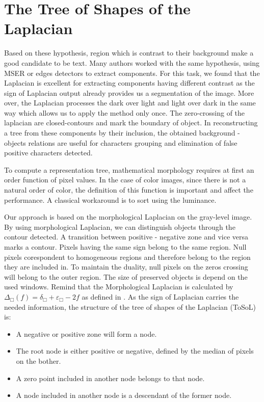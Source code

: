\section{The Tree of Shapes of the Laplacian}
\par
Based on these hypothesis, region which is contrast to their background make a good candidate to be text. Many authors worked with the same hypothesis, using MSER \cite{Neumann12} \cite{xucheng.2013.pami} \cite{Shi_2013:_MSER} or edges detectors \cite{Liu.2006.CRA} \cite{Yan:2011:Nerocomputing} to extract components. For this task, we found that the Laplacian is excellent for extracting components having different contrast as the sign of Laplacian output already provides us a segmentation of the image. More over, the Laplacian processes the dark over light and light over dark in the same way which allows us to apply the method only once. The zero-crossing of the laplacian are closed-contours and mark the boundary of object. In reconstructing a tree from these components by their inclusion, the obtained background - objects relations are useful for characters grouping and elimination of false positive characters detected.
\par
To compute a representation tree, mathematical morphology requires at first an order function of pixel values. In the case of color images, since there is not a natural order of color, the definition of this function is important and affect the performance. A classical workaround is to sort using the luminance. 
\par
Our approach is based on the morphological Laplacian on the gray-level image. By using morphological Laplacian, we can distinguish objects through the contour detected. A transition between positive - negative zone and vice versa marks a contour. Pixels having the same sign belong to the same region. Null pixels corespondent to homogeneous regions and therefore belong to the region they are included in. To maintain the duality, null pixels on the zeros crossing will belong to the outer region. The size of preserved objects is depend on the used windows. Remind that the Morphological Laplacian is calculated by $ \Delta_\Box (f) = \delta_\Box + \varepsilon_\Box -2f $ as defined in \cite{Vliet_anedge}. As the sign of Laplacian carries the needed information, the structure of the tree of shapes of the Laplacian (ToSoL) is:
\begin{itemize}
\item A negative or positive zone will form a node.
\item The root node is either positive or negative, defined by the median of pixels on the bother.
\item A zero point included in another node belongs to that node.
\item A node included in another node is a descendant of the former node.
\end{itemize}
